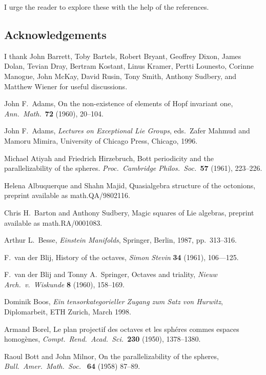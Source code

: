 \noindent I urge the reader to explore these with the help of the references.

\subsection*{Acknowledgements}  

I thank John Barrett, Toby Bartels, Robert Bryant, Geoffrey Dixon, James 
Dolan, Tevian Dray, Bertram Kostant, Linus Kramer, Pertti Lounesto,
Corinne Manogue, John McKay, David Rusin, Tony Smith, Anthony Sudbery, and 
Matthew Wiener for useful discussions.    
   
\begin{thebibliography}{10}   

 John F.\ Adams,
On the non-existence of elements of Hopf invariant
one, {\sl Ann.\ Math.\ }{\bf 72} (1960), 20--104.

 John F.\ Adams, {\sl Lectures on Exceptional Lie   
Groups}, eds.\ Zafer Mahmud and Mamoru Mimira, University of    
Chicago Press, Chicago, 1996.   

 Michael Atiyah and Friedrich Hirzebruch, 
Bott periodicity and the parallelizability of the spheres. 
{\sl Proc.\ Cambridge Philos.\ Soc.\ }{\bf 57} (1961), 223--226. 

 Helena Albuquerque and Shahn Majid, Quasialgebra structure  
of the octonions, preprint available as math.QA/9802116.   
 
 Chris H.\ Barton and Anthony Sudbery, Magic squares of Lie    
algebras, preprint available as math.RA/0001083.   
  
 Arthur L.\ Besse, {\sl Einstein Manifolds}, Springer,   
Berlin, 1987, pp.\ 313--316.   
 
 F.\ van der Blij, History of the octaves, {\sl Simon 
Stevin} {\bf 34} (1961), 106---125. 
 
 F.\ van der Blij and Tonny A.\ Springer, Octaves and 
triality, {\sl Nieuw Arch.\ v.\ Wiskunde} {\bf 8} (1960), 158--169. 

 Dominik Boos, {\sl Ein tensorkategorieller Zugang zum Satz 
von Hurwitz}, Diplomarbeit, ETH Zurich, March 1998.

 Armand Borel, Le plan projectif des octaves et les sph\'eres
commes espaces homog\`enes, {\sl Compt.\ Rend.\ Acad.\ Sci.\ }{\bf 230}
(1950), 1378--1380.

 Raoul Bott and John Milnor, On the parallelizability   
of the spheres, {\sl Bull.\ Amer.\ Math.\ Soc.\ } {\bf 64} (1958)   
87--89.   
 

\end{thebibliography}
